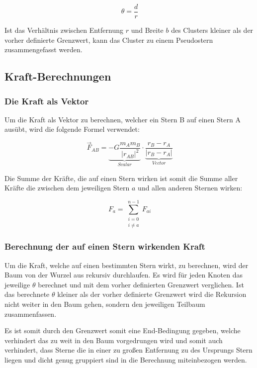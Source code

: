 \begin{equation}
\label{eq:barnes_hut} \theta = \frac{d}{r}
\end{equation}

Ist das Verhältnis zwischen Entfernung \( r \) und Breite \( b \) des Clusters
kleiner als der vorher definierte Grenzwert, kann das Cluster zu einem
Pseudostern zusammengefasst werden.

\subsection{Kraft-Berechnungen}

\subsubsection{Die Kraft als Vektor}
Um die Kraft als Vektor zu berechnen, welcher ein Stern B auf einen Stern A
ausübt, wird die folgende Formel verwendet:

\begin{equation}
    \vec{F}_{AB} = \underbrace{-G \frac{m_A m_B}{|r_{AB}|^2}}_{Scalar}
    \cdot \underbrace{\frac{r_B - r_A}{|r_B - r_A|}}_{Vector}
\end{equation}

Die Summe der Kräfte, die auf einen Stern wirken ist somit die Summe aller
Kräfte die zwischen dem jeweiligen Stern \( a \) und allen anderen Sternen
wirken:

\begin{equation}
    F_{a} = \sum_{\substack{i=0 \\ i\neq a}}^{n-1} F_{ai}
\end{equation}

\subsubsection{Berechnung der auf einen Stern wirkenden Kraft}
\par Um die Kraft, welche auf einen bestimmten Stern wirkt, zu berechnen, wird der
Baum von der Wurzel aus rekursiv durchlaufen. Es wird für jeden Knoten das
jeweilige \( \theta \) berechnet und mit dem vorher definierten Grenzwert
verglichen. Ist das berechnete \( \theta \) kleiner als der vorher definierte
Grenzwert wird die Rekursion nicht weiter in den Baum gehen, sondern den
jeweiligen Teilbaum zusammenfassen.

\par Es ist somit durch den Grenzwert somit eine End-Bedingung gegeben, welche
verhindert das zu weit in den Baum vorgedrungen wird und somit auch verhindert,
dass Sterne die in einer zu großen Entfernung zu des Ursprungs Stern liegen und
dicht genug gruppiert sind in die Berechnung miteinbezogen werden.

